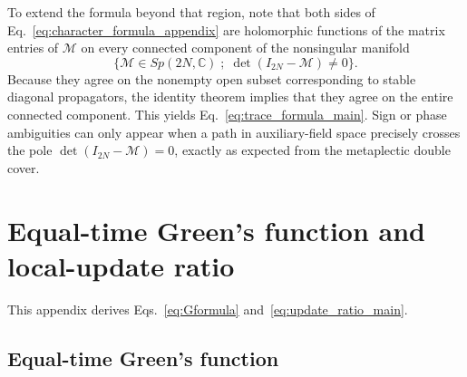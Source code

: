\documentclass[twocolumn,aps,prb,10pt,amsmath,amssymb,amsthm,superscriptaddress]{revtex4-2}
\newcommand{\mc}[1]{\mathcal{#1}}
\theoremstyle{remark}
\begin{document}
To extend the formula beyond that region, note that both sides of Eq.~\eqref{eq:character_formula_appendix} are holomorphic functions of the matrix entries of $\mc M$ on every connected component of the nonsingular manifold
\begin{equation}
    \{\mc M\in Sp(2N,\mathbb C)\; ;\; \det(I_{2N}-\mc M)\neq 0\}.
\end{equation}
Because they agree on the nonempty open subset corresponding to stable diagonal propagators, the identity theorem implies that they agree on the entire connected component. This yields Eq.~\eqref{eq:trace_formula_main}. Sign or phase ambiguities can only appear when a path in auxiliary-field space precisely crosses the pole $\det(I_{2N}-\mc M)=0$, exactly as expected from the metaplectic double cover.

\section{Equal-time Green's function and local-update ratio}
\label{app:green}

This appendix derives Eqs.~\eqref{eq:Gformula} and~\eqref{eq:update_ratio_main}.

\subsection{Equal-time Green's function}
\end{document}
